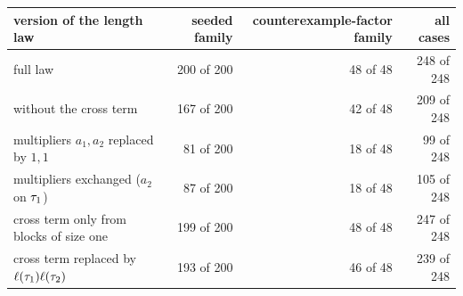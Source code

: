 \begin{tabular}{lrrr}
\toprule
version of the length law & seeded family & counterexample-factor family & all cases\\
\midrule
full law & 200 of 200 & 48 of 48 & 248 of 248 \\
without the cross term & 167 of 200 & 42 of 48 & 209 of 248 \\
multipliers $a_1,a_2$ replaced by $1,1$ & 81 of 200 & 18 of 48 & 99 of 248 \\
multipliers exchanged ($a_2$ on $\tau_1$) & 87 of 200 & 18 of 48 & 105 of 248 \\
cross term only from blocks of size one & 199 of 200 & 48 of 48 & 247 of 248 \\
cross term replaced by $\ell(\tau_1)\ell(\tau_2)$ & 193 of 200 & 46 of 48 & 239 of 248 \\
\bottomrule
\end{tabular}
